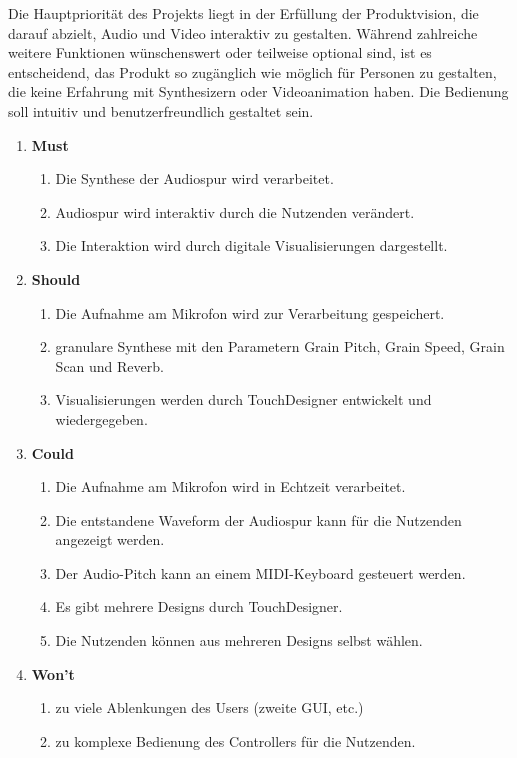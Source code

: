 \documentclass[12pt]{scrartcl}%
\theoremstyle{nonumberplain}
\begin{document}
Die Hauptpriorität des Projekts liegt in der Erfüllung der Produktvision, die darauf abzielt, Audio und Video interaktiv zu gestalten. Während zahlreiche weitere Funktionen wünschenswert oder teilweise optional sind, ist es entscheidend, das Produkt so zugänglich wie möglich für Personen zu gestalten, die keine Erfahrung mit Synthesizern oder Videoanimation haben. Die Bedienung soll intuitiv und benutzerfreundlich gestaltet sein.
\begin{enumerate}[]
\item \textbf{Must}
  \begin{enumerate}[-]
  \item Die Synthese der Audiospur wird verarbeitet.
  \item Audiospur wird interaktiv durch die Nutzenden verändert.
  \item Die Interaktion wird durch digitale Visualisierungen dargestellt.
  \end{enumerate}
\item \textbf{Should}
  \begin{enumerate}[-]
  \item Die Aufnahme am Mikrofon wird zur Verarbeitung gespeichert.
  \item granulare Synthese mit den Parametern Grain Pitch, Grain Speed, Grain Scan und Reverb.
  \item Visualisierungen werden durch TouchDesigner entwickelt und wiedergegeben.
  \end{enumerate}
\item \textbf{Could}
  \begin{enumerate}[-]
  \item Die Aufnahme am Mikrofon wird in Echtzeit verarbeitet.
  \item Die entstandene Waveform der Audiospur kann für die Nutzenden angezeigt werden.
  \item Der Audio-Pitch kann an einem MIDI-Keyboard gesteuert werden.
  \item Es gibt mehrere Designs durch TouchDesigner.
  \item Die Nutzenden können aus mehreren Designs selbst wählen.
  \end{enumerate}
\item \textbf{Won't}
  \begin{enumerate}[-]
  \item zu viele Ablenkungen des Users (zweite GUI, etc.)
  \item zu komplexe Bedienung des Controllers für die Nutzenden.
  \end{enumerate}
\end{enumerate}
\end{document}
